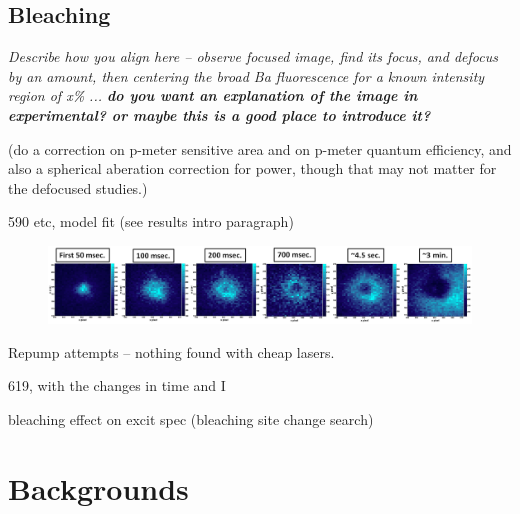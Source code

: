 \subsection{Bleaching}
\label{subsec:bleaching}

\emph{\color{gray}Describe how you align here -- observe focused image, find its focus, and defocus by an amount, then centering the broad Ba fluorescence for a known intensity region of x\% ... \textbf{do you want an explanation of the image in experimental?  or maybe this is a good place to introduce it?}}

({\color{red}do a correction on p-meter sensitive area and on p-meter quantum efficiency, and also a spherical aberation correction for power, though that may not matter for the defocused studies.})

590 etc, model fit (see results intro paragraph)

\begin{figure} %
        \centering
                \includegraphics[width=.9\textwidth]{figures/hole_bleach_590.png}
                \caption{}
\label{fig:testfig}
\end{figure}

Repump attempts -- nothing found with cheap lasers.

619, with the changes in time and I

bleaching effect on excit spec (bleaching site change search)

\section{Backgrounds}
\label{sec:bgs}

